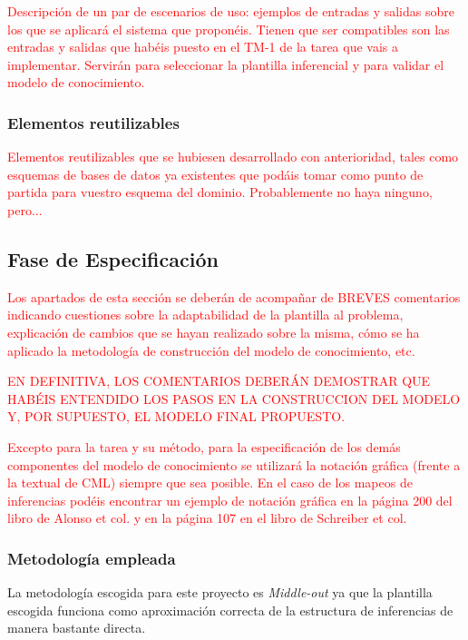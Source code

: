 \documentclass[12pt,a4paper,twoside,spanish]{article}      %
\begin{document}
\textcolor {red} {Descripción de un par de escenarios de uso: ejemplos de entradas y salidas sobre los que se aplicará el sistema que proponéis. Tienen que ser compatibles son las entradas y salidas que habéis puesto en el TM-1 de la tarea que vais a implementar. Servirán para seleccionar la plantilla inferencial y para validar el modelo de conocimiento.}

\subsubsection{Elementos reutilizables}

\textcolor {red} {Elementos reutilizables que se hubiesen desarrollado con anterioridad, tales como esquemas de bases de datos ya existentes que podáis tomar como punto de partida para vuestro esquema del dominio. Probablemente no haya ninguno, pero...}


\subsection{Fase de Especificación}

\textcolor {red} {Los apartados de esta sección  se deberán de acompañar de BREVES comentarios indicando cuestiones sobre la adaptabilidad de la plantilla al problema, explicación de cambios que se hayan realizado sobre la misma, cómo se ha aplicado la metodología de construcción del modelo de conocimiento, etc.}

\textcolor {red} {EN DEFINITIVA, LOS COMENTARIOS DEBERÁN DEMOSTRAR QUE HABÉIS ENTENDIDO LOS PASOS EN LA CONSTRUCCION DEL MODELO Y, POR SUPUESTO, EL MODELO FINAL PROPUESTO.}

\textcolor {red} {Excepto para la tarea y su método, para la especificación de los demás componentes del modelo de conocimiento se utilizará la notación gráfica (frente a la textual de CML) siempre que sea posible. En el caso de los mapeos de inferencias podéis encontrar un ejemplo de notación gráfica en la página 200 del libro de Alonso et col. y en la página 107 en el libro de Schreiber et col.}


\subsubsection{Metodología empleada}
La metodología escogida para este proyecto es \textit{Middle-out} ya que la plantilla escogida funciona como aproximación correcta de la estructura de inferencias de manera bastante directa.
\end{document}
